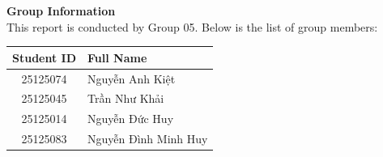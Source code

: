 \begin{center}
    \vspace*{2cm}
    {\Huge \textbf{Group Information}}\\[1.5cm]
    
    {\Large This report is conducted by Group 05. Below is the list of group members:}\\[1.5cm]

    {\Large
    \renewcommand{\arraystretch}{1.5}
    \begin{tabular}{cl}
        \textbf{Student ID} & \textbf{Full Name} \\
        \hline
        25125074 & Nguyễn Anh Kiệt \\
        25125045 & Trần Như Khải \\
        25125014 & Nguyễn Đức Huy \\
        25125083 & Nguyễn Đình Minh Huy \\
    \end{tabular}
    }
\end{center}

\newpage
